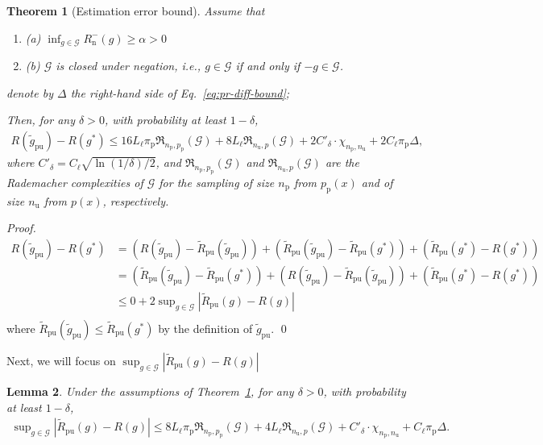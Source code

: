 \documentclass[12pt]{article}
\newcommand{\cG}{\mathcal{G}}
\newcommand{\fR}{\mathfrak{R}}
\newcommand{\prp}{p_\mathrm{p}}
\newcommand{\pip}{\pi_\mathrm{p}}
\newcommand{\Np}{{n_\mathrm{p}}}
\newcommand{\Nu}{{n_\mathrm{u}}}
\newcommand{\Rn}{R_\mathrm{n}}
\newcommand{\tRpu}{\widetilde{R}_\mathrm{pu}}
\newcommand{\tgpu}{\widetilde{g}_\mathrm{pu}}
\newtheorem{thm}{Theorem}[section]
\newtheorem{lem}[thm]{Lemma}
\theoremstyle{definition}
\begin{document}
\begin{thm}[Estimation error bound]
	\label{thm:est-err}%
	Assume that
	\begin{enumerate}
		\item (a) $\inf_{g\in\cG}\Rn^-(g)\ge\alpha>0$ 
		
		\item 	(b) $\cG$ is closed under negation, i.e., $g\in\cG$ if and only if $-g\in\cG$.
	\end{enumerate}

 denote by $\Delta$ the right-hand side of Eq.~\eqref{eq:pr-diff-bound};
 
	Then, for any $\delta>0$, with probability at least $1-\delta$,
	\begin{align}
	\label{eq:est-err-bound}%
	R(\tgpu)-R(g^*)
	\le 16L_\ell\pip\fR_{\Np,\prp}(\cG)
	+8L_\ell\fR_{\Nu,p}(\cG)
	+2C'_\delta\cdot\chi_{\Np,\Nu} +2C_\ell\pip\Delta,
	\end{align}
	where $C'_\delta=C_\ell\sqrt{\ln(1/\delta)/2}$, and $\fR_{\Np,\prp}(\cG)$ and $\fR_{\Nu,p}(\cG)$ are the Rademacher complexities of $\cG$ for the sampling of size $\Np$ from $\prp(x)$ and of size $\Nu$ from $p(x)$, respectively.
\end{thm}

\begin{proof}
\begin{align*}
R(\tgpu)-R(g^*)
&= \left(R(\tgpu)-\tRpu(\tgpu)\right)
+\left(\tRpu(\tgpu)-\tRpu(g^*)\right)
+\left(\tRpu(g^*)-R(g^*)\right)\\
&= \left(\tRpu(\tgpu)-\tRpu(g^*)\right)
+\left(R(\tgpu)-\tRpu(\tgpu)\right)
+\left(\tRpu(g^*)-R(g^*)\right)\\
&\le 0 +2\sup\nolimits_{g\in\cG}|\tRpu(g)-R(g)|\\
\end{align*}
where $\tRpu(\tgpu)\le\tRpu(g^*)$ by the definition of $\tgpu$. \qed
\end{proof}

Next, we will focus on $\sup\nolimits_{g\in\cG}|\tRpu(g)-R(g)|$




\begin{lem}
	\label{thm:uni-dev}%
	Under the assumptions of Theorem~\ref{thm:est-err}, for any $\delta>0$, with probability at least $1-\delta$,
	\begin{align}
	\label{eq:uni-dev-bound}%
	\sup\nolimits_{g\in\cG}|\tRpu(g)-R(g)|
	\le 8L_\ell\pip\fR_{\Np,\prp}(\cG)
	+4L_\ell\fR_{\Nu,p}(\cG)
	+C'_\delta\cdot\chi_{\Np,\Nu} +C_\ell\pip\Delta.
	\end{align}
\end{lem}
\end{document}
